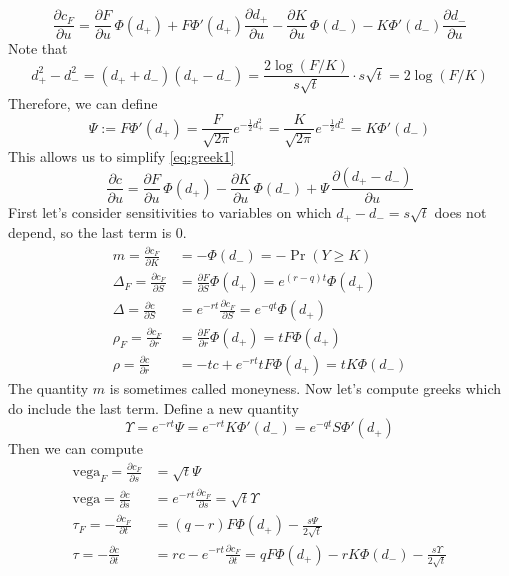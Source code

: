 \documentclass[english,seminar]{pnotes}
\begin{document}
\begin{equation}
	\frac {\partial c_F}{\partial u} = \frac{\partial F}{\partial u} \, \Phi(d_+) + F \Phi'(d_+) \frac{\partial d_+}{\partial u} - \frac{\partial K} {\partial u} \, \Phi(d_-) - K \Phi'(d_-) \frac{\partial{d_-}}{\partial u} \label{eq:greek1}
\end{equation}
Note that 
\begin{equation}
	d_+^2-d_-^2 = (d_++d_-)(d_+-d_-)= \frac{2 \log(F/K)}{s \sqrt t} \cdot s \sqrt t = 2\log(F/K)
\end{equation}
Therefore, we can define
\begin{equation}
	\Psi := F \Phi'(d_+) = \frac F {\sqrt{2\pi}} e^{-\frac 1 2 d_+^2} = \frac K {\sqrt{2\pi}}  e^{-\frac 1 2 d_-^2}= K \Phi'(d_-)
\end{equation}
This allows us to simplify \eqref{eq:greek1}
\begin{equation}
	\frac {\partial c}{\partial u} = \frac{\partial F}{\partial u} \, \Phi(d_+)  - \frac{\partial K} {\partial u} \, \Phi(d_-) + \Psi  \, \frac{\partial (d_+-d_-)}{\partial u} \label{eq:greek master}
\end{equation}
First let's consider sensitivities to variables on which $d_+-d_- = s \sqrt t$ does not depend, so the last term is 0.  
\begin{equation}
\begin{split}
	m = \frac{\partial c_F}{\partial K} &= -\Phi(d_-) = -\Pr( Y \geq K ) \\
	\Delta_F = \frac{\partial c_F}{\partial S} &= \frac{\partial F}{\partial S} \Phi(d_+)  = e^{(r-q)t} \Phi(d_+)\\
	\Delta = \frac{\partial c}{\partial S} &= e^{-rt} \frac{\partial c_F}{\partial S}  = e^{-q t} \Phi(d_+)\\
	\rho_F = \frac{\partial c_F}{\partial r} &= \frac{\partial F}{\partial r} \Phi(d_+) = t F \Phi(d_+) \\
	\rho = \frac{\partial c}{\partial r} &= -t c + e^{-rt} t F \Phi(d_+) = t K \Phi(d_-)
\end{split}
\end{equation}
The quantity $m$ is sometimes called moneyness.  Now let's compute greeks which do include the last term.  Define a new quantity
\begin{equation}
	\Upsilon = e^{-rt}\Psi = e^{-rt} K \Phi'(d_-) = e^{-qt} S \Phi'(d_+)	
\end{equation}
Then we can compute
\begin{equation}
\begin{split}
	\text{vega}_F = \frac{\partial c_F}{\partial s} &=  \sqrt t \Psi\\
	\text{vega} = \frac{\partial c}{\partial s} &=  e^{-r t}  \frac{\partial c_F}{\partial s} = \sqrt t \Upsilon \\
	\tau_F = -\frac{\partial c_F}{\partial t} &=  (q-r)F \Phi(d_+) - \frac {s \Psi} {2 \sqrt{t}} \\
	\tau = -\frac{\partial c}{\partial t} &= r c - e^{-rt}\frac{\partial c_F}{\partial t} = q F \Phi(d_+) - rK \Phi(d_-) - \frac {s \Upsilon } {2 \sqrt{t}}
\end{split}
\end{equation}
\end{document}
